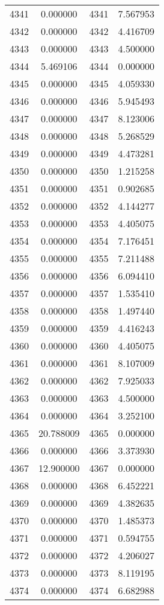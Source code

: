 \documentclass[12pt]{article}
\begin{document}
\begin{longtable}{@{}cccc@{}}
4341 & 0.000000 & 4341 & 7.567953 \\
4342 & 0.000000 & 4342 & 4.416709 \\
4343 & 0.000000 & 4343 & 4.500000 \\
4344 & 5.469106 & 4344 & 0.000000 \\
4345 & 0.000000 & 4345 & 4.059330 \\
4346 & 0.000000 & 4346 & 5.945493 \\
4347 & 0.000000 & 4347 & 8.123006 \\
4348 & 0.000000 & 4348 & 5.268529 \\
4349 & 0.000000 & 4349 & 4.473281 \\
4350 & 0.000000 & 4350 & 1.215258 \\
4351 & 0.000000 & 4351 & 0.902685 \\
4352 & 0.000000 & 4352 & 4.144277 \\
4353 & 0.000000 & 4353 & 4.405075 \\
4354 & 0.000000 & 4354 & 7.176451 \\
4355 & 0.000000 & 4355 & 7.211488 \\
4356 & 0.000000 & 4356 & 6.094410 \\
4357 & 0.000000 & 4357 & 1.535410 \\
4358 & 0.000000 & 4358 & 1.497440 \\
4359 & 0.000000 & 4359 & 4.416243 \\
4360 & 0.000000 & 4360 & 4.405075 \\
4361 & 0.000000 & 4361 & 8.107009 \\
4362 & 0.000000 & 4362 & 7.925033 \\
4363 & 0.000000 & 4363 & 4.500000 \\
4364 & 0.000000 & 4364 & 3.252100 \\
4365 & 20.788009 & 4365 & 0.000000 \\
4366 & 0.000000 & 4366 & 3.373930 \\
4367 & 12.900000 & 4367 & 0.000000 \\
4368 & 0.000000 & 4368 & 6.452221 \\
4369 & 0.000000 & 4369 & 4.382635 \\
4370 & 0.000000 & 4370 & 1.485373 \\
4371 & 0.000000 & 4371 & 0.594755 \\
4372 & 0.000000 & 4372 & 4.206027 \\
4373 & 0.000000 & 4373 & 8.119195 \\
4374 & 0.000000 & 4374 & 6.682988 \\

\end{longtable}
\end{document}
